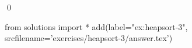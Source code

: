 
\begin{ex} 
  \label{ex:heapsort-3}
  
  \qed
\end{ex} 
\begin{python0}
from solutions import *
add(label="ex:heapsort-3",
    srcfilename='exercises/heapsort-3/answer.tex') 
\end{python0}
